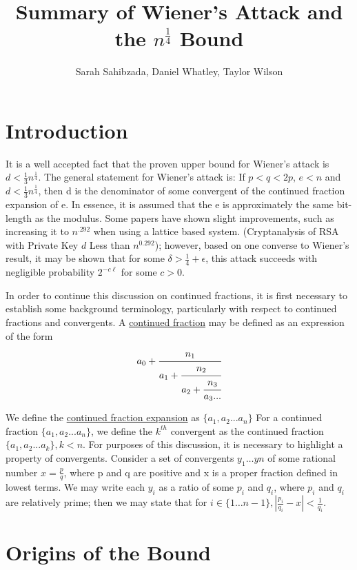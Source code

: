 \documentclass[a4paper]{article}
\title{Summary of Wiener's Attack and the $n^{\frac{1}{4}}$ Bound}
\author{Sarah Sahibzada, Daniel Whatley, Taylor Wilson}
\begin{document}
\maketitle

\section{Introduction}
It is a well accepted fact that the proven upper bound for Wiener’s attack is $d < \frac{1}{3}n^{\frac{1}{4}}$.  The general statement for Wiener’s attack is: If $p < q < 2p$, $e < n$ and $d < \frac{1}{3}n^{\frac{1}{4}}$, then d is the denominator of some convergent of the continued fraction expansion of e.  In essence, it is assumed that the e is approximately the same bit-length as the modulus. Some papers have shown slight improvements, such as increasing it to $n^{.292}$ when using a lattice based system. (Cryptanalysis of RSA with Private Key $d$ Less than $n^{0.292}$); however, based on one converse to Wiener's result, it may be shown that for some $\delta > \frac{1}{4} + \epsilon$, this attack succeeds with negligible probability $2^{-c\ell}$ for some $c > 0$. \par
In order to continue this discussion on continued fractions, it is first necessary to establish some background terminology, particularly with respect to continued fractions and convergents. A \underline{continued fraction} may be defined as an expression of the form 
\begin{equation}
a_{0} + \cfrac{n_{1}}{a_{1} + \cfrac{n_{2}}{a_{2} + \cfrac{n_{3}}{a_{3}...}}}
\end{equation}

We define the \underline{continued fraction expansion} as $\{a_{1}, a_{2} . . . a_{n}\}$ For a continued fraction $\{a_{1}, a_{2} . . . a_{n}\}$, we define the $k^{th}$ convergent as the continued fraction $\{a_{1}, a_{2} . . . a_{k}\}, k < n$. For purposes of this discussion, it is necessary to highlight a property of convergents. Consider a set of convergents $y_{1} \dots y{n}$ of some rational number $ x = \frac{p}{q}$, where p and q are positive and x is a proper fraction defined in lowest terms. We may write each $y_{i}$ as a ratio of some $p_{i}$ and $q_{i}$, where $p_{i}$ and $q_{i}$ are relatively prime; then we may state that for $i \in \{ 1 \dots n - 1\}, |\frac{p_{i}}{q_{i}} - x| < \frac{1}{q_{i}}$.  \par 


\section{Origins of the Bound}
\end{document}
